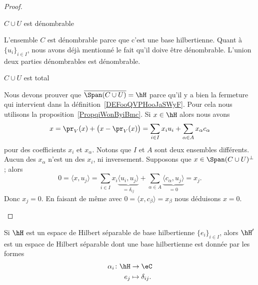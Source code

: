 \begin{proof}
\begin{subproof}
        \item[\( C\cup U\) est dénombrable]

            L'ensemble \( C\) est dénombrable parce que c'est une base hilbertienne. Quant à \( \{ u_i \}_{i\in I}\), nous avons déjà mentionné le fait qu'il doive être dénombrable. L'union deux parties dénombrables est dénombrable.

        \item[\( C\cup U\) est total]

            Nous devons prouver que \( \overline{ \Span(C\cup U) }=\hH\) parce qu'il y a bien la fermeture qui intervient dans la définition~\ref{DEFooQVPHooJaSWyF}. Pour cela nous utilisons la proposition~\ref{PropqiWonByiBmc}.
            Si \( x\in \hH\) alors nous avons
           \begin{equation}
               x=\pr_V(x)+\big( x-\pr_V(x) \big)=\sum_{i\in I}x_iu_i+\sum_{\alpha\in A}x_{\alpha}c_{\alpha}
           \end{equation}
           pour des coefficients \( x_i\) et \( x_{\alpha}\). Notons que \( I\) et \( A\) sont deux ensembles différents. Aucun des \( x_{\alpha}\) n'est un des \( x_i\), ni inversement. Supposons que \( x\in \Span(C\cup U)^{\perp}\); alors
           \begin{equation}
               0=\langle x, u_j\rangle =\sum_{i\in I}x_i\underbrace{\langle u_i, u_j\rangle }_{=\delta_{ij}}+\sum_{\alpha\in A}\underbrace{\langle c_{\alpha}, u_j\rangle }_{=0}=x_j.
           \end{equation}
           Donc \( x_j=0\). En faisant de même avec \( 0=\langle x, c_{\beta}\rangle =x_{\beta}\) nous déduisons \( x=0\).
    \end{subproof}
\end{proof}

\begin{proposition}      \label{PROPooZQIAooUEWLtg}
    Si \( \hH\) est un espace de Hilbert séparable de base hilbertienne \( \{ e_i \}_{i\in I}\), alors \( \hH'\) est un espace de Hilbert séparable dont une base hilbertienne est donnée par les formes
    \begin{equation}
        \begin{aligned}
            \alpha_i\colon \hH&\to \eC \\
            e_j&\mapsto \delta_{ij}. 
        \end{aligned}
    \end{equation}
\end{proposition}

